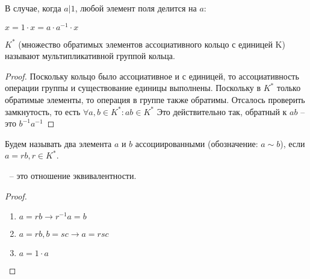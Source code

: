\documentclass[document.tex]{subfiles}
\begin{document}
\begin{remark}
В случае, когда $a|1$, любой элемент поля делится на $a$:

$x = 1 \cdot x = a \cdot a^{-1} \cdot x$
\end{remark}

\begin{definition}
$K^*$ (множество обратимых элементов ассоциативного кольцо с единицей K) называют мультипликативной группой кольца.
\end{definition}

\begin{proof}
	Поскольку кольцо было ассоциативное и с единицей, то ассоциативность операции группы и существование единицы выполнены.
	Поскольку в $K^*$ только обратимые элементы, то операция в группе также обратимы. Отсалось проверить замкнутость, то есть $\forall a, b \in K^*: ab \in K^*$
	Это действительно так, обратный к $ab$ -- это $b^{-1}a^{-1}$ 
\end{proof}

\begin{definition}
Будем называть два элемента $a$ и $b$ ассоциированными (обозначение: $a \sim b$), если $a = rb, r \in K^*$.
\end{definition}

\begin{exercise}
$~$ -- это отношение эквивалентности.
\end{exercise}

\begin{proof}
	~\begin{enumerate}
		\item $a = rb \rightarrow r^{-1}a = b$
		\item $a = rb, b = sc \rightarrow a = rsc$
		\item $a = 1 \cdot a$
	\end{enumerate}
\end{proof}
\end{document}

